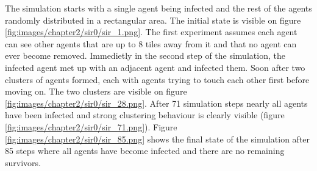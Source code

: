 The simulation starts with a single agent being infected and the rest of the agents randomly distributed in a rectangular area.
The initial state is visible on figure \ref{fig:images/chapter2/sir0/sir_1.png}.
The first experiment assumes each agent can see other agents that are up to 8 tiles away from it and that no agent can ever become removed.
Immedietly in the second step of the simulation, the infected agent met up with an adjacent agent and infected them.
Soon after two clusters of agents formed, each with agents trying to touch each other first before moving on.
The two clusters are visible on figure \ref{fig:images/chapter2/sir0/sir_28.png}.
After 71 simulation steps nearly all agents have been infected and strong clustering behaviour is clearly visible (figure \ref{fig:images/chapter2/sir0/sir_71.png}).
Figure \ref{fig:images/chapter2/sir0/sir_85.png} shows the final state of the simulation after 85 steps where all agents have become infected and there are no remaining survivors.

